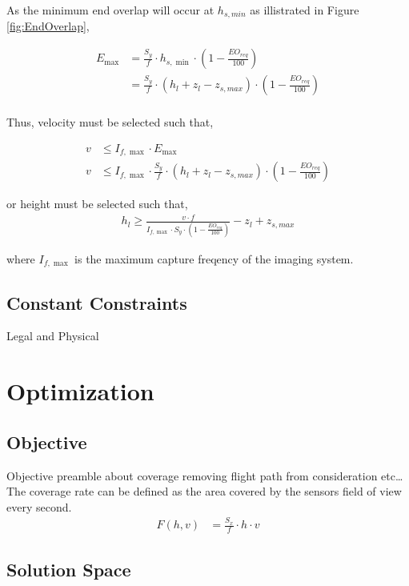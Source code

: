 \documentclass[11pt]{article}
\begin{document}
\noindent
As the minimum end overlap will occur at $h_{s,min}$ as illistrated in Figure \ref{fig:EndOverlap}, 

\begin{align}
    E_{\max} &= \frac{S_y}{f} \cdot h_{s,\min} \cdot (1-\frac{EO_{req}}{100})\\
    &= \frac{S_y}{f} \cdot (h_l + z_l - z_{s,max}) \cdot (1-\frac{EO_{req}}{100})\\
\end{align}

\noindent
Thus, velocity must be selected such that,

\begin{align}
   v &\leq I_{f,\max} \cdot E_{\max}\\
   v &\leq I_{f,\max} \cdot \frac{S_y}{f} \cdot (h_l + z_l - z_{s,max}) \cdot (1-\frac{EO_{req}}{100})
\end{align}

or height must be selected such that,
\begin{align}
  h_l \geq \frac{v \cdot f}{I_{f,\max} \cdot S_y \cdot (1-\frac{EO_{req}}{100})} - z_l + z_{s,max}
\end{align}

\noindent
where $I_{f,\max}$ is the maximum capture freqency of the imaging system. 

\subsection{Constant Constraints}
Legal and Physical

\newpage
\section{Optimization}

\subsection{Objective}
Objective preamble about coverage removing flight path from consideration etc\dots\\

The coverage rate can be defined as the area covered by the sensors field of view every second. 
\begin{align}
  F(h,v) &= \frac{S_x}{f} \cdot h \cdot v \label{eq:ObjFunc}
\end{align}

\subsection{Solution Space}
\end{document}
